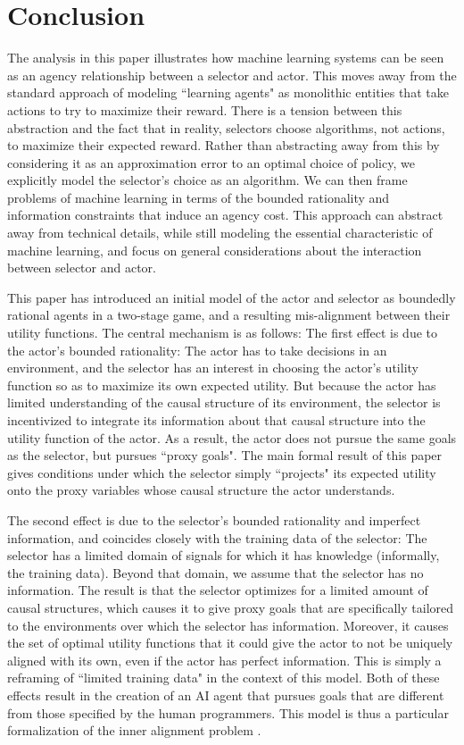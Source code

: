 \section{Conclusion}\label{sec:conclusion}

The analysis in this paper illustrates how machine learning systems can be seen as an agency relationship between a selector and actor. This moves away from the standard approach of modeling ``learning agents" as monolithic entities that take actions to try to maximize their reward. There is a tension between this abstraction and the fact that in reality, selectors choose algorithms, not actions, to maximize their expected reward. Rather than abstracting away from this by considering it as an approximation error to an optimal choice of policy, we explicitly model the selector's choice as an algorithm. We can then frame problems of machine learning in terms of the bounded rationality and information constraints that induce an agency cost. This approach can abstract away from technical details, while still modeling the essential characteristic of machine learning, and focus on general considerations about the interaction between selector and actor. 

This paper has introduced an initial model of the actor and selector as boundedly rational agents in a two-stage game, and a resulting mis-alignment between their utility functions. The central mechanism is as follows: The first effect is due to the actor's bounded rationality: The actor has to take decisions in an environment, and the selector has an interest in choosing the actor's utility function so as to maximize its own expected utility. But because the actor has limited understanding of the causal structure of its environment, the selector is incentivized to integrate its information about that causal structure into the utility function of the actor. As a result, the actor does not pursue the same goals as the selector, but pursues ``proxy goals". The main formal result of this paper gives conditions under which the selector simply ``projects" its expected utility onto the proxy variables whose causal structure the actor understands. 

The second effect is due to the selector's bounded rationality and imperfect information, and coincides closely with the training data of the selector: The selector has a limited domain of signals for which it has knowledge (informally, the training data). Beyond that domain, we assume that the selector has no information. The result is that the selector optimizes for a limited amount of causal structures, which causes it to give proxy goals that are specifically tailored to the environments over which the selector has information. Moreover, it causes the set of optimal utility functions that it could give the actor to not be uniquely aligned with its own, even if the actor has perfect information. This is simply a reframing of ``limited training data" in the context of this model. Both of these effects result in the creation of an AI agent that pursues goals that are different from those specified by the human programmers. This model is thus a particular formalization of the inner alignment problem \citep{Hubinger2019}.


